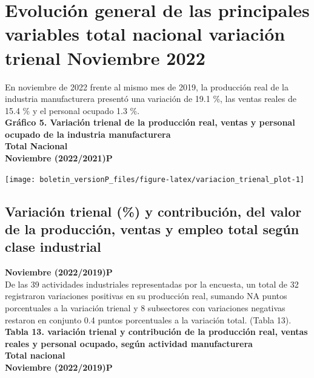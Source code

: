 \documentclass[
]{article}
\begin{document}
\hypertarget{evoluciuxf3n-general-de-las-principales-variables-total-nacional-variaciuxf3n-trienal-noviembre-2022}{%
\section{Evolución general de las principales variables total nacional
variación trienal Noviembre
2022}\label{evoluciuxf3n-general-de-las-principales-variables-total-nacional-variaciuxf3n-trienal-noviembre-2022}}

En noviembre de 2022 frente al mismo mes de 2019, la producción real de
la industria manufacturera presentó una variación de 19.1 \%, las ventas
reales de 15.4 \% y el personal ocupado 1.3 \%.\\

\textbf{Gráfico 5. Variación trienal de la producción real, ventas y
personal ocupado de la industria manufacturera}\\
\textbf{Total Nacional}\\
\textbf{Noviembre (2022/2021)P}\\

\begin{center}\texttt{[image: boletin\_versionP\_files/figure-latex/variacion\_trienal\_plot-1]} \end{center}

\hypertarget{variaciuxf3n-trienal-y-contribuciuxf3n-del-valor-de-la-producciuxf3n-ventas-y-empleo-total-seguxfan-clase-industrial}{%
\subsection{Variación trienal (\%) y contribución, del valor de la
producción, ventas y empleo total según clase
industrial}\label{variaciuxf3n-trienal-y-contribuciuxf3n-del-valor-de-la-producciuxf3n-ventas-y-empleo-total-seguxfan-clase-industrial}}

\textbf{Noviembre (2022/2019)P}\\

De las 39 actividades industriales representadas por la encuesta, un
total de 32 registraron variaciones positivas en su producción real,
sumando NA puntos porcentuales a la variación trienal y 8 subsectores
con variaciones negativas restaron en conjunto 0.4 puntos porcentuales a
la variación total. (Tabla 13).\\
\newpage \textbf{Tabla 13. variación trienal y contribución de la
producción real, ventas reales y personal ocupado, según actividad
manufacturera}\\
\textbf{Total nacional}\\
\textbf{Noviembre (2022/2019)P}\\
\end{document}
